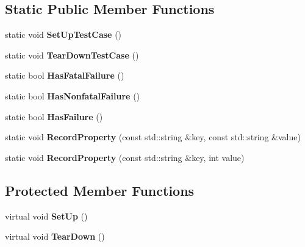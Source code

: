 \subsection*{Static Public Member Functions}
\begin{DoxyCompactItemize}
\item 
\mbox{\label{classtesting_1_1_test_a5ccbac42fee8c5b00b0bfe89b6c49d79}} 
static void {\bfseries Set\+Up\+Test\+Case} ()
\item 
\mbox{\label{classtesting_1_1_test_af374706cbaf0ffc460f4fd04e7c150f1}} 
static void {\bfseries Tear\+Down\+Test\+Case} ()
\item 
\mbox{\label{classtesting_1_1_test_a5e83604628ef542af888d631566ff60c}} 
static bool {\bfseries Has\+Fatal\+Failure} ()
\item 
\mbox{\label{classtesting_1_1_test_a8c00e8cc6fe10616b480bd54d2a426cb}} 
static bool {\bfseries Has\+Nonfatal\+Failure} ()
\item 
\mbox{\label{classtesting_1_1_test_a7a00be7dd0a6bfdc8d47a1b784623613}} 
static bool {\bfseries Has\+Failure} ()
\item 
\mbox{\label{classtesting_1_1_test_a1559ce1c83f56993b582650c091535a7}} 
static void {\bfseries Record\+Property} (const std\+::string \&key, const std\+::string \&value)
\item 
\mbox{\label{classtesting_1_1_test_a373da47b491b1e64e355d22d6ec99b5b}} 
static void {\bfseries Record\+Property} (const std\+::string \&key, int value)
\end{DoxyCompactItemize}
\subsection*{Protected Member Functions}
\begin{DoxyCompactItemize}
\item 
\mbox{\label{classtesting_1_1_test_a190315150c303ddf801313fd1a777733}} 
virtual void {\bfseries Set\+Up} ()
\item 
\mbox{\label{classtesting_1_1_test_a5f0ab439802cbe0ef7552f1a9f791923}} 
virtual void {\bfseries Tear\+Down} ()
\end{DoxyCompactItemize}
